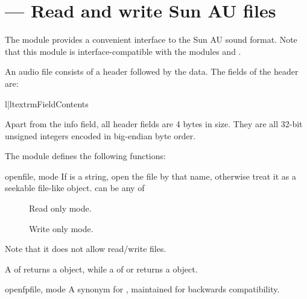 \section{ ---
         Read and write Sun AU files}


The  module provides a convenient interface to the Sun
AU sound format.  Note that this module is interface-compatible with
the modules  and .

An audio file consists of a header followed by the data.  The fields
of the header are:

\begin{tableii}{l|l}{textrm}{Field}{Contents}
\end{tableii}

Apart from the info field, all header fields are 4 bytes in size.
They are all 32-bit unsigned integers encoded in big-endian byte
order.


The  module defines the following functions:

\begin{funcdesc}{open}{file, mode}
If  is a string, open the file by that name, otherwise treat it
as a seekable file-like object.  can be any of
\begin{description}
	\item[] Read only mode.
	\item[] Write only mode.
\end{description}
Note that it does not allow read/write files.

A  of  returns a 
object, while a  of  or  returns
a  object.
\end{funcdesc}

\begin{funcdesc}{openfp}{file, mode}
A synonym for , maintained for backwards compatibility.
\end{funcdesc}

